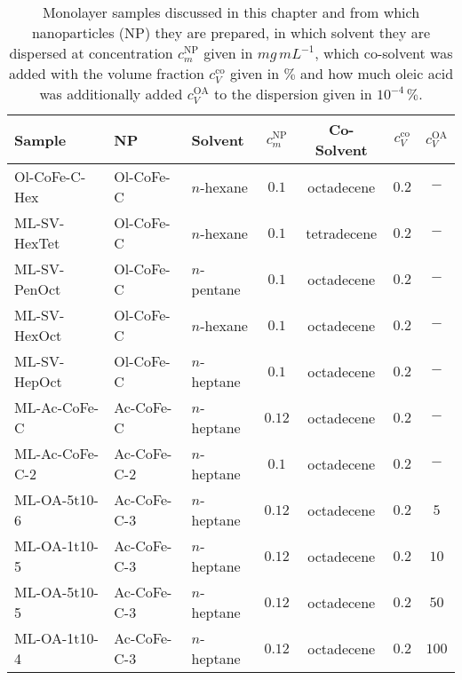 \documentclass[\main/dresen_thesis.tex]{subfiles}
\begin{document}
    \begin{table}[!htbp]
      \centering
      \caption{\label{tab:monolayers:charMethod:sampleConcentrations}Monolayer samples discussed in this chapter and from which nanoparticles (NP) they are prepared, in which solvent they are dispersed at concentration $c_m^\mathrm{NP}$ given in $\unit{mg \, mL^{-1}}$, which co-solvent was added with the volume fraction $c_V^\mathrm{co}$ given in $\%$ and how much oleic acid was additionally added $c_V^\mathrm{OA}$ to the dispersion given in $10^{-4}\,\%$.}
      \begin{tabular}{ l | l | l | c | c | c | c}
        \textbf{Sample} & NP          & Solvent              & $c_m^\mathrm{NP}$ & Co-Solvent  & $c_V^\mathrm{co}$  & $c_V^\mathrm{OA}$\\
        \hline
        Ol-CoFe-C-Hex   & Ol-CoFe-C   & $\mathit{n}$-hexane  & $0.1$             & octadecene  & $0.2$              & $-$\\
        ML-SV-HexTet    & Ol-CoFe-C   & $\mathit{n}$-hexane  & $0.1$             & tetradecene & $0.2$              & $-$\\
        ML-SV-PenOct    & Ol-CoFe-C   & $\mathit{n}$-pentane & $0.1$             & octadecene  & $0.2$              & $-$\\
        ML-SV-HexOct    & Ol-CoFe-C   & $\mathit{n}$-hexane  & $0.1$             & octadecene  & $0.2$              & $-$\\
        ML-SV-HepOct    & Ol-CoFe-C   & $\mathit{n}$-heptane & $0.1$             & octadecene  & $0.2$              & $-$\\
        ML-Ac-CoFe-C    & Ac-CoFe-C   & $\mathit{n}$-heptane & $0.12$            & octadecene  & $0.2$              & $-$\\
        ML-Ac-CoFe-C-2  & Ac-CoFe-C-2 & $\mathit{n}$-heptane & $0.1$             & octadecene  & $0.2$              & $-$\\
        ML-OA-5t10-6    & Ac-CoFe-C-3 & $\mathit{n}$-heptane & $0.12$            & octadecene  & $0.2$              & $5$\\
        ML-OA-1t10-5    & Ac-CoFe-C-3 & $\mathit{n}$-heptane & $0.12$            & octadecene  & $0.2$              & $10$\\
        ML-OA-5t10-5    & Ac-CoFe-C-3 & $\mathit{n}$-heptane & $0.12$            & octadecene  & $0.2$              & $50$\\
        ML-OA-1t10-4    & Ac-CoFe-C-3 & $\mathit{n}$-heptane & $0.12$            & octadecene  & $0.2$              & $100$\\
        \hline
      \end{tabular}
    \end{table}
\end{document}
